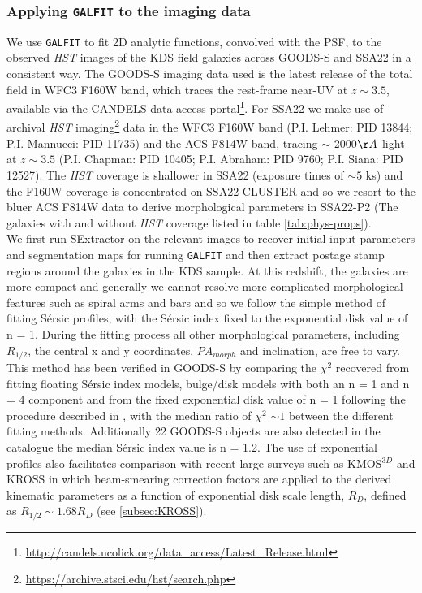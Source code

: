 \documentclass[fleqn,usenatbib]{mn2e}
\newcommand{\Sers}{S\'{e}rsic }
\begin{document}
\subsubsection{Applying {\tt GALFIT} to the imaging data}\label{subsubsec:galfitting}
We use {\tt GALFIT} \citep{Peng2010_galfit} to fit 2D analytic functions, convolved with the PSF, to the observed {\em HST} images of the KDS field galaxies across GOODS-S and SSA22 in a consistent way.
The GOODS-S imaging data used is the latest release of the total field in WFC3 F160W band, which traces the rest-frame near-UV at $z \sim 3.5$, available via the CANDELS \citep{Grogin2011,Koekemoer2011} data access portal\footnote{\url{http://candels.ucolick.org/data_access/Latest_Release.html}}.
For SSA22 we make use of archival {\em HST} imaging\footnote{\url{https://archive.stsci.edu/hst/search.php}} data in the WFC3 F160W band (P.I. Lehmer: PID 13844; P.I. Mannucci: PID 11735) and the ACS F814W band, tracing $\sim$ 2000$\AA$ light at $z\sim 3.5$ (P.I. Chapman: PID 10405; P.I. Abraham: PID 9760; P.I. Siana: PID 12527).
The {\em HST} coverage is shallower in SSA22 (exposure times of $\sim 5$ ks) and the F160W coverage is concentrated on SSA22-CLUSTER and so we resort to the bluer ACS F814W data to derive morphological parameters in SSA22-P2 (The galaxies with and without {\em HST} coverage listed in table \ref{tab:phys-props}). \\

We first run SExtractor \citep{Bertin1996} on the relevant images to recover initial input parameters and segmentation maps for running {\tt GALFIT} and then extract postage stamp regions around the galaxies in the KDS sample.
At this redshift, the galaxies are more compact and generally we cannot resolve more complicated morphological features such as spiral arms and bars and so we follow the simple method of fitting \Sers profiles, with the \Sers index fixed to the exponential disk value of n = 1.
During the fitting process all other morphological parameters, including $R_{1/2}$, the central x and y coordinates, $PA_{morph}$ and inclination, are free to vary.
This method has been verified in GOODS-S by comparing the $\chi ^{2}$ recovered from fitting floating \Sers index models, bulge/disk models with both an n = 1 and n = 4 component and from the fixed exponential disk value of n = 1 following the procedure described in \cite{Bruce2012}, with the median ratio of $\chi ^{2}$ $\sim 1$ between the different fitting methods. Additionally 22 GOODS-S objects are also detected in the \cite{VanderWel2012} catalogue the median \Sers index value is n = 1.2.
The use of exponential profiles also facilitates comparison with recent large surveys such as KMOS$^{3D}$ \citep{Wisnioski2015} and KROSS \citep{Harrison2017} in which beam-smearing correction factors are applied to the derived kinematic parameters as a function of exponential disk scale length, $R_{D}$, defined as $R_{1/2} \sim 1.68 R_{D}$ (see \cref{subsec:KROSS}). \\
\end{document}

